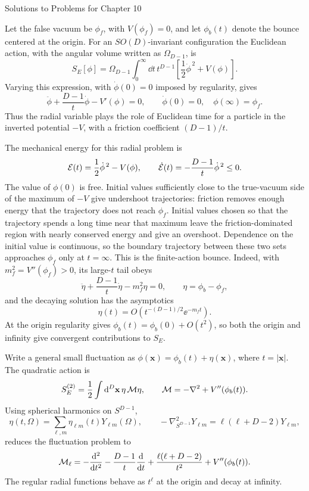 \begin{bankssolutions}{Solutions to Problems for Chapter 10}

Let the false vacuum be $\phi_f$, with $V(\phi_f)=0$, and let
$\phi_b(t)$ denote the bounce centered at the origin.  For an
$SO(D)$-invariant configuration the Euclidean action, with the angular volume
written as $\Omega_{D-1}$, is
\[
 S_E[\phi]=\Omega_{D-1}\int_0^\infty\dd t\,t^{D-1}
 \left[\frac12\dot\phi^{\,2}+V(\phi)\right].
\]
Varying this expression, with $\dot\phi(0)=0$ imposed by regularity, gives
\[
 \ddot\phi+\frac{D-1}{t}\dot\phi-V'(\phi)=0,
 \qquad
 \dot\phi(0)=0,\quad \phi(\infty)=\phi_f.
\]
Thus the radial variable plays the role of Euclidean time for a particle in
the inverted potential $-V$, with a friction coefficient $(D-1)/t$.

The mechanical energy for this radial problem is
\[
 {\cal E}(t)=\frac12\dot\phi^{\,2}-V(\phi),
 \qquad
 \dot{\cal E}(t)=-\frac{D-1}{t}\dot\phi^{\,2}\leq0.
\]
The value of $\phi(0)$ is free.  Initial values sufficiently close to the
true-vacuum side of the maximum of $-V$ give undershoot trajectories: friction
removes enough energy that the trajectory does not reach $\phi_f$.  Initial
values chosen so that the trajectory spends a long time near that maximum
leave the friction-dominated region with nearly conserved energy and give an
overshoot.  Dependence on the initial value is continuous, so the boundary
trajectory between these two sets approaches $\phi_f$ only at $t=\infty$.
This is the finite-action bounce.  Indeed, with
$m_f^2=V''(\phi_f)>0$, its large-$t$ tail obeys
\[
 \ddot\eta+\frac{D-1}{t}\dot\eta-m_f^2\eta=0,
 \qquad \eta=\phi_b-\phi_f,
\]
and the decaying solution has the asymptotics
\[
 \eta(t)=O\!\left(t^{-(D-1)/2}\ee^{-m_ft}\right).
\]
At the origin regularity gives $\phi_b(t)=\phi_b(0)+O(t^2)$, so both the
origin and infinity give convergent contributions to $S_E$.

Write a general small fluctuation as
$\phi(\mathbf x)=\phi_b(t)+\eta(\mathbf x)$, where $t=|\mathbf x|$.  The quadratic action is
\[
 S_E^{(2)}=\frac12\int\mathop{}\!\mathrm{d}^D\mathbf x\,\eta\,{\cal M}\eta,
 \qquad
 {\cal M}=-\nabla^2+V''(\phi_b(t)).
\]
Using spherical harmonics on $S^{D-1}$,
\[
 \eta(t,\Omega)=\sum_{\ell,m}\eta_{\ell m}(t)Y_{\ell m}(\Omega),
 \qquad
 -\nabla_{S^{D-1}}^2Y_{\ell m}=\ell(\ell+D-2)Y_{\ell m},
\]
reduces the fluctuation problem to
\[
 {\cal M}_\ell=-\frac{\mathop{}\!\mathrm{d}^2}{\mathop{}\!\mathrm{d} t^2}
 -\frac{D-1}{t}\frac{\mathop{}\!\mathrm{d}}{\mathop{}\!\mathrm{d} t}
 +\frac{\ell(\ell+D-2)}{t^2}+V''(\phi_b(t)).
\]
The regular radial functions behave as $t^\ell$ at the origin and decay at
infinity.


\end{bankssolutions}
